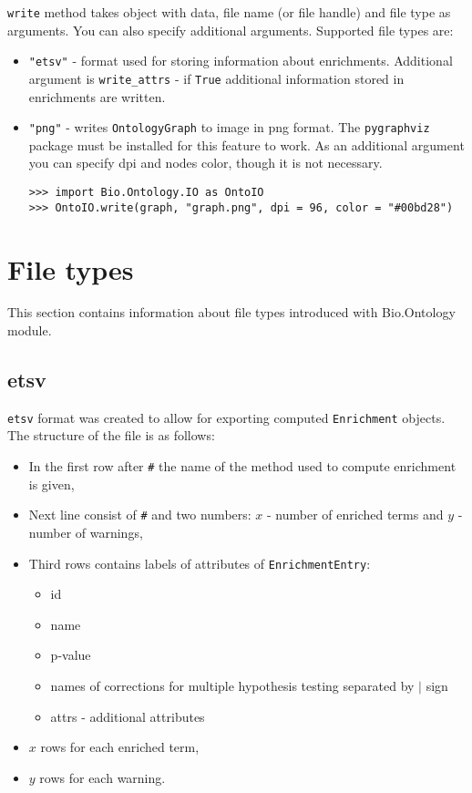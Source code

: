 \verb|write| method takes object with data, file name (or file handle) and file
type as arguments. You can also specify additional arguments.
Supported file types are:
\begin{itemize}
\item \verb|"etsv"| - format used for storing information about
enrichments. Additional argument is
\verb|write_attrs| - if \verb|True| additional information stored
in enrichments are written.

\item \verb|"png"| - writes \verb|OntologyGraph| to image in png format. The
\verb|pygraphviz| package must be installed for this feature to work. As an
additional argument you can specify dpi and nodes color, though it is not
necessary.
\begin{verbatim}
>>> import Bio.Ontology.IO as OntoIO
>>> OntoIO.write(graph, "graph.png", dpi = 96, color = "#00bd28")
\end{verbatim}

\end{itemize}
\section{File types}
\label{ch:fileformats}
This section contains information about file types introduced with
Bio.Ontology module.
\subsection{etsv}
\verb|etsv| format was created to allow for exporting computed
\verb|Enrichment| objects.
The structure of the file is as follows:
\begin{itemize}
\item In the first row after \verb|#| the name of the method used
to compute enrichment is given,
\item Next line consist of \verb|#| and two numbers: $x$ - number of 
enriched terms and $y$ - number of warnings,
\item Third rows contains labels of attributes of
\verb|EnrichmentEntry|:
\begin{itemize}
\item id
\item name
\item p-value
\item names of corrections for multiple hypothesis testing separated by
$|$ sign
\item attrs - additional attributes
\end{itemize}
\item $x$ rows for each enriched term,
\item $y$ rows for each warning.
\end{itemize}

